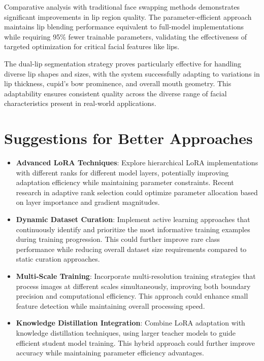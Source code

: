 \documentclass[12pt,a4paper]{report}
\begin{document}
Comparative analysis with traditional face swapping methods demonstrates significant improvements in lip region quality. The parameter-efficient approach maintains lip blending performance equivalent to full-model implementations while requiring 95\% fewer trainable parameters, validating the effectiveness of targeted optimization for critical facial features like lips.

The dual-lip segmentation strategy proves particularly effective for handling diverse lip shapes and sizes, with the system successfully adapting to variations in lip thickness, cupid's bow prominence, and overall mouth geometry. This adaptability ensures consistent quality across the diverse range of facial characteristics present in real-world applications.

\section{Suggestions for Better Approaches}

\begin{itemize}
\item \textbf{Advanced LoRA Techniques}: Explore hierarchical LoRA implementations with different ranks for different model layers, potentially improving adaptation efficiency while maintaining parameter constraints. Recent research in adaptive rank selection could optimize parameter allocation based on layer importance and gradient magnitudes.

\item \textbf{Dynamic Dataset Curation}: Implement active learning approaches that continuously identify and prioritize the most informative training examples during training progression. This could further improve rare class performance while reducing overall dataset size requirements compared to static curation approaches.

\item \textbf{Multi-Scale Training}: Incorporate multi-resolution training strategies that process images at different scales simultaneously, improving both boundary precision and computational efficiency. This approach could enhance small feature detection while maintaining overall processing speed.

\item \textbf{Knowledge Distillation Integration}: Combine LoRA adaptation with knowledge distillation techniques, using larger teacher models to guide efficient student model training. This hybrid approach could further improve accuracy while maintaining parameter efficiency advantages.
\end{itemize}
\end{document}
